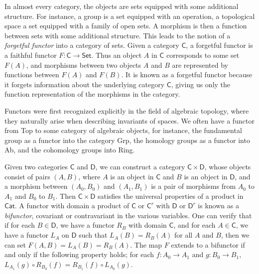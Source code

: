 \begin{example}
    In almost every category, the objects are sets equipped with some additional structure. For instance, a group is a set equipped with an operation, a topological space a set equipped with a family of open sets. A morphism is then a function between sets with some additional structure. This leads to the notion of a {\it forgetful functor} into a category of sets. Given a category $\mathsf{C}$, a forgetful functor is a faithful functor $F: \mathsf{C} \to \textsf{Set}$. Thus an object $A$ in $\mathsf{C}$ corresponds to some set $F(A)$, and morphisms between two objects $A$ and $B$ are represented by functions between $F(A)$ and $F(B)$. It is known as a forgetful functor because it forgets information about the underlying category $\mathsf{C}$, giving us only the function representation of the morphisms in the category.
\end{example}

\begin{example}
    Functors were first recognized explicitly in the field of algebraic topology, where they naturally arise when describing invariants of spaces. We often have a functor from {\sf Top} to some category of algebraic objects, for instance, the fundamental group as a functor into the category {\sf Grp}, the homology groups as a functor into {\sf Ab}, and the cohomology groups into {\sf Ring}.
\end{example}

Given two categories $\mathsf{C}$ and $\mathsf{D}$, we can construct a category $\mathsf{C} \times \mathsf{D}$, whose objects consist of pairs $(A,B)$, where $A$ is an object in $\mathsf{C}$ and $B$ is an object in $\mathsf{D}$, and a morphism between $(A_0, B_0)$ and $(A_1,B_1)$ is a pair of morphisms from $A_0$ to $A_1$ and $B_0$ to $B_1$. Then $\mathsf{C} \times \mathsf{D}$ satisfies the universal properties of a product in $\mathsf{Cat}$. A functor with domain a product of $\mathsf{C}$ or $\mathsf{C}^r$ with $\mathsf{D}$ or $\mathsf{D}^r$ is known as a \emph{bifunctor}, covariant or contravariant in the various variables. One can verify that if for each $B \in \mathsf{D}$, we have a functor $R_B$ with domain $\mathsf{C}$, and for each $A \in \mathsf{C}$, we have a functor $L_A$ on $\mathsf{D}$ such that $L_A(B) = R_B(A)$ for all $A$ and $B$, then we can set $F(A,B) = L_A(B) = R_B(A)$. The map $F$ extends to a bifunctor if and only if the following property holds; for each $f: A_0 \to A_1$ and $g: B_0 \to B_1$, $L_{A_1}(g) \circ R_{B_0}(f) = R_{B_1}(f) \circ L_{A_0}(g)$.

